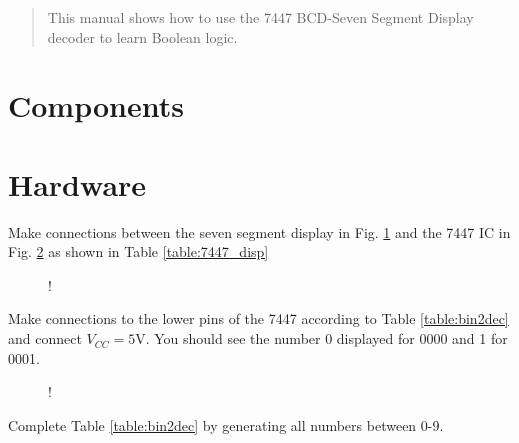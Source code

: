 \documentclass[journal,12pt,twocolumn]{IEEEtran}
\begin{document}
\tableofcontents

\IEEEpeerreviewmaketitle


%
%
\begin{abstract}
This manual shows how to use the 7447 BCD-Seven Segment Display decoder to learn Boolean logic.
\end{abstract}
\section{Components}
\begin{table}[!h]
\centering

\caption{}
\label{table:components}
\end{table}
\section{Hardware}
\begin{problem}
Make connections between the seven segment display in Fig. \ref{fig:sevenseg} and the  7447 IC in Fig. \ref{fig:7447} as shown in Table \ref{table:7447_disp}
\end{problem}
%
\begin{table}[!h]
\centering

\caption{}
\label{table:7447_disp}
\end{table}
\begin{figure}[!h]
\begin{center}
\resizebox {0.5\columnwidth} {!} {

}
\end{center}
\caption{}
\label{fig:sevenseg}
\end{figure}
\begin{problem}
Make connections to the lower pins of the 7447 according to
Table \ref{table:bin2dec} and connect $V_{CC} = 5$V. You should see the number 0 displayed for 0000 and 1 for 0001.
\end{problem}
%
\begin{table}[!h]
\centering

\caption{}
\label{table:bin2dec}
\end{table}
%
\begin{figure}[!h]
\begin{center}
\resizebox {\columnwidth} {!} {

}
\end{center}
\caption{}
\label{fig:7447}
\end{figure}
%
\begin{problem}
Complete Table \ref{table:bin2dec} by generating all numbers between 0-9.
\end{problem}
\end{document}
